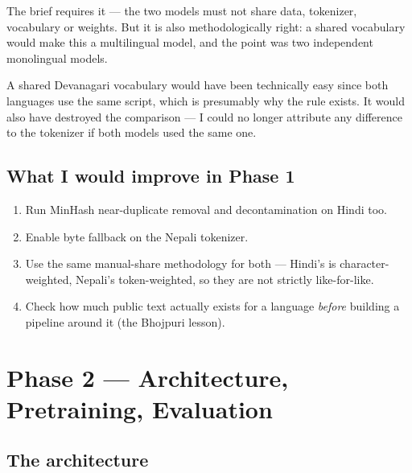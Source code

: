 \documentclass[11pt]{report}
\begin{document}
\begin{shortans}
The brief requires it --- the two models must not share data, tokenizer,
vocabulary or weights. But it is also methodologically right: a shared
vocabulary would make this a multilingual model, and the point was two
independent monolingual models.
\end{shortans}

\begin{deeper}
A shared Devanagari vocabulary would have been technically easy since both
languages use the same script, which is presumably why the rule exists. It
would also have destroyed the comparison --- I could no longer attribute any
difference to the tokenizer if both models used the same one.
\end{deeper}

\section{What I would improve in Phase 1}

\begin{enumerate}
\item Run MinHash near-duplicate removal and decontamination on Hindi too.
\item Enable byte fallback on the Nepali tokenizer.
\item Use the same manual-share methodology for both --- Hindi's is
character-weighted, Nepali's token-weighted, so they are not strictly
like-for-like.
\item Check how much public text actually exists for a language \emph{before}
building a pipeline around it (the Bhojpuri lesson).
\end{enumerate}

\chapter{Phase 2 --- Architecture, Pretraining, Evaluation}

\section{The architecture}
\end{document}
